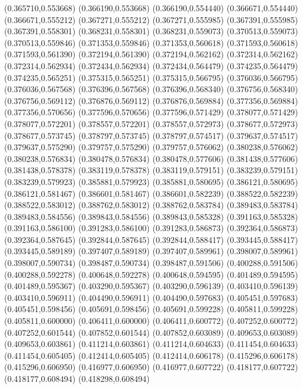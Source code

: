 (0.365710,0.553668)
(0.366190,0.553668)
(0.366190,0.554440)
(0.366671,0.554440)
(0.366671,0.555212)
(0.367271,0.555212)
(0.367271,0.555985)
(0.367391,0.555985)
(0.367391,0.558301)
(0.368231,0.558301)
(0.368231,0.559073)
(0.370513,0.559073)
(0.370513,0.559846)
(0.371353,0.559846)
(0.371353,0.560618)
(0.371593,0.560618)
(0.371593,0.561390)
(0.372194,0.561390)
(0.372194,0.562162)
(0.372314,0.562162)
(0.372314,0.562934)
(0.372434,0.562934)
(0.372434,0.564479)
(0.374235,0.564479)
(0.374235,0.565251)
(0.375315,0.565251)
(0.375315,0.566795)
(0.376036,0.566795)
(0.376036,0.567568)
(0.376396,0.567568)
(0.376396,0.568340)
(0.376756,0.568340)
(0.376756,0.569112)
(0.376876,0.569112)
(0.376876,0.569884)
(0.377356,0.569884)
(0.377356,0.570656)
(0.377596,0.570656)
(0.377596,0.571429)
(0.378077,0.571429)
(0.378077,0.572201)
(0.378557,0.572201)
(0.378557,0.572973)
(0.378677,0.572973)
(0.378677,0.573745)
(0.378797,0.573745)
(0.378797,0.574517)
(0.379637,0.574517)
(0.379637,0.575290)
(0.379757,0.575290)
(0.379757,0.576062)
(0.380238,0.576062)
(0.380238,0.576834)
(0.380478,0.576834)
(0.380478,0.577606)
(0.381438,0.577606)
(0.381438,0.578378)
(0.383119,0.578378)
(0.383119,0.579151)
(0.383239,0.579151)
(0.383239,0.579923)
(0.385881,0.579923)
(0.385881,0.580695)
(0.386121,0.580695)
(0.386121,0.581467)
(0.386601,0.581467)
(0.386601,0.582239)
(0.388522,0.582239)
(0.388522,0.583012)
(0.388762,0.583012)
(0.388762,0.583784)
(0.389483,0.583784)
(0.389483,0.584556)
(0.389843,0.584556)
(0.389843,0.585328)
(0.391163,0.585328)
(0.391163,0.586100)
(0.391283,0.586100)
(0.391283,0.586873)
(0.392364,0.586873)
(0.392364,0.587645)
(0.392844,0.587645)
(0.392844,0.588417)
(0.393445,0.588417)
(0.393445,0.589189)
(0.397407,0.589189)
(0.397407,0.589961)
(0.398007,0.589961)
(0.398007,0.590734)
(0.398487,0.590734)
(0.398487,0.591506)
(0.400288,0.591506)
(0.400288,0.592278)
(0.400648,0.592278)
(0.400648,0.594595)
(0.401489,0.594595)
(0.401489,0.595367)
(0.403290,0.595367)
(0.403290,0.596139)
(0.403410,0.596139)
(0.403410,0.596911)
(0.404490,0.596911)
(0.404490,0.597683)
(0.405451,0.597683)
(0.405451,0.598456)
(0.405691,0.598456)
(0.405691,0.599228)
(0.405811,0.599228)
(0.405811,0.600000)
(0.406411,0.600000)
(0.406411,0.600772)
(0.407252,0.600772)
(0.407252,0.601544)
(0.407852,0.601544)
(0.407852,0.603089)
(0.409653,0.603089)
(0.409653,0.603861)
(0.411214,0.603861)
(0.411214,0.604633)
(0.411454,0.604633)
(0.411454,0.605405)
(0.412414,0.605405)
(0.412414,0.606178)
(0.415296,0.606178)
(0.415296,0.606950)
(0.416977,0.606950)
(0.416977,0.607722)
(0.418177,0.607722)
(0.418177,0.608494)
(0.418298,0.608494)
